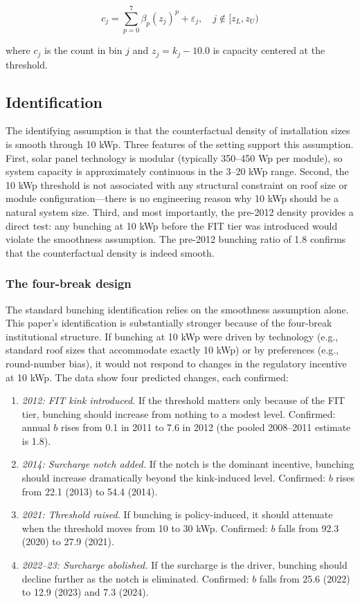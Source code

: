 \documentclass[12pt]{article}
\begin{document}
\begin{equation}
c_j = \sum_{p=0}^{7} \beta_p (z_j)^p + \varepsilon_j, \quad j \notin [z_L, z_U)
\end{equation}

where $c_j$ is the count in bin $j$ and $z_j = k_j - 10.0$ is capacity centered at the threshold.

\subsection{Identification}

The identifying assumption is that the counterfactual density of installation sizes is smooth through 10 kWp. Three features of the setting support this assumption. First, solar panel technology is modular (typically 350--450 Wp per module), so system capacity is approximately continuous in the 3--20 kWp range. Second, the 10 kWp threshold is not associated with any structural constraint on roof size or module configuration---there is no engineering reason why 10 kWp should be a natural system size. Third, and most importantly, the pre-2012 density provides a direct test: any bunching at 10 kWp before the FIT tier was introduced would violate the smoothness assumption. The pre-2012 bunching ratio of 1.8 confirms that the counterfactual density is indeed smooth.

\subsubsection*{The four-break design} The standard bunching identification relies on the smoothness assumption alone. This paper's identification is substantially stronger because of the four-break institutional structure. If bunching at 10 kWp were driven by technology (e.g., standard roof sizes that accommodate exactly 10 kWp) or by preferences (e.g., round-number bias), it would not respond to changes in the regulatory incentive at 10 kWp. The data show four predicted changes, each confirmed:

\begin{enumerate}
  \item \textit{2012: FIT kink introduced.} If the threshold matters only because of the FIT tier, bunching should increase from nothing to a modest level. Confirmed: annual $b$ rises from 0.1 in 2011 to 7.6 in 2012 (the pooled 2008--2011 estimate is 1.8).
  \item \textit{2014: Surcharge notch added.} If the notch is the dominant incentive, bunching should increase dramatically beyond the kink-induced level. Confirmed: $b$ rises from 22.1 (2013) to 54.4 (2014).
  \item \textit{2021: Threshold raised.} If bunching is policy-induced, it should attenuate when the threshold moves from 10 to 30 kWp. Confirmed: $b$ falls from 92.3 (2020) to 27.9 (2021).
  \item \textit{2022--23: Surcharge abolished.} If the surcharge is the driver, bunching should decline further as the notch is eliminated. Confirmed: $b$ falls from 25.6 (2022) to 12.9 (2023) and 7.3 (2024).
\end{enumerate}
\end{document}
